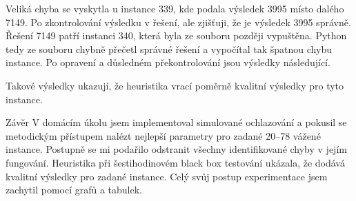 Veliká chyba se vyskytla u instance 339, kde podala výsledek 3995 místo dalého 7149. Po zkontrolování výsledku v řešení, ale zjišťuji, že je výsledek 3995 správně. Řešení 7149 patří instanci 340, která byla ze souboru později vypuštěna. Python tedy ze souboru chybně přečetl správné řešení a vypočítal tak špatnou chybu instance. Po opravení a důsledném překontrolování jsou výsledky následující.

\bigskip
\centerline{}\bigskip

Takové výsledky ukazují, že heuristika vrací poměrně kvalitní výsledky pro tyto instance.


\sec Závěr
V domácím úkolu jsem implementoval simulované ochlazování a pokusil se metodickým přístupem nalézt nejlepší parametry pro zadané 20--78 vážené instance. Postupně se mi podařilo odstranit všechny identifikované chyby v jejím fungování. Heuristika při šestihodinovém black box testování ukázala, že dodává kvalitní výsledky pro zadané instance. Celý svůj postup experimentace jsem zachytil pomocí grafů a tabulek.


\bye
